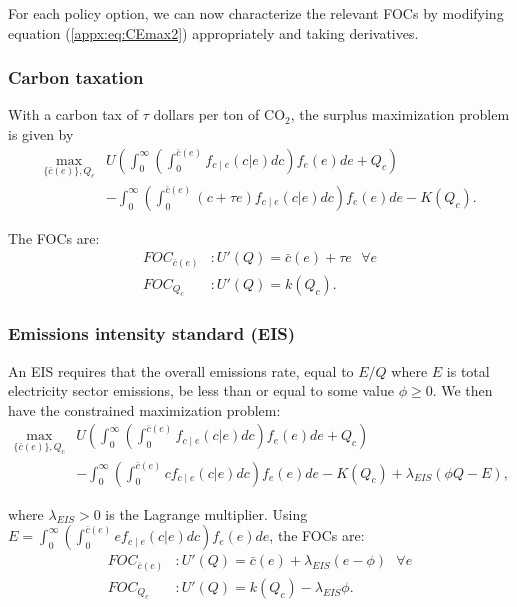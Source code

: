 \documentclass[12pt]{article}
\begin{document}
For each policy option, we can now characterize the relevant FOCs by modifying equation (\ref{appx:eq:CEmax2}) appropriately and taking derivatives.

\subsubsection*{Carbon taxation}
With a carbon tax of $\tau$ dollars per ton of CO$_2$, the surplus maximization problem is given by
\begin{align}
    \max_{\{\bar{c}(e)\},Q_c} & U\left(\int_0^\infty\left(\int_0^{\bar{c}(e)}f_{c\mid e}(c|e)dc\right)f_e(e)de + Q_c\right) \nonumber \\ 
    &- \int_0^\infty\left(\int_0^{\bar{c}(e)}(c+\tau e)f_{c\mid e}(c|e)dc\right)f_e(e)de - K(Q_c). \label{appx:eq:CEmaxCT}
\end{align}

The FOCs are:
\begin{align}
    FOC_{\bar{c}(e)}&: U'(Q) = \bar{c}(e) + \tau e\text{  } \forall e \label{appx:eq:FOC_c_CT} \\
    FOC_{Q_c}&: U'(Q) = k(Q_c). \label{appx:eq:FOC_Qc_CT}
\end{align}



\subsubsection*{Emissions intensity standard (EIS)}

An EIS requires that the overall emissions rate, equal to $E/Q$ where $E$ is total electricity sector emissions, be less than or equal to some value $\phi\geq0$. We then have the constrained maximization problem:
\begin{align}
    \max_{\{\bar{c}(e)\},Q_c} & U\left(\int_0^\infty\left(\int_0^{\bar{c}(e)}f_{c\mid e}(c|e)dc\right)f_e(e)de + Q_c\right)  \nonumber \\
    &- \int_0^\infty\left(\int_0^{\bar{c}(e)}cf_{c\mid e}(c|e)dc\right)f_e(e)de - K(Q_c) + \lambda_{EIS}(\phi Q - E), \label{appx:eq:CEmaxEIS}
\end{align}

\noindent where $\lambda_{EIS}>0$ is the Lagrange multiplier. Using $E=\int_0^\infty (\int_0^{\bar{c}(e)}ef_{c\mid e}(c|e)dc)f_e(e)de$, the FOCs are:
\begin{align}
    FOC_{\bar{c}(e)}&: U'(Q) = \bar{c}(e) + \lambda_{EIS}(e-\phi)\text{  } \forall e \label{appx:eq:FOC_c_EIS} \\
    FOC_{Q_c}&: U'(Q) = k(Q_c) - \lambda_{EIS}\phi. \label{appx:eq:FOC_Qc_EIS}
\end{align}
\end{document}
